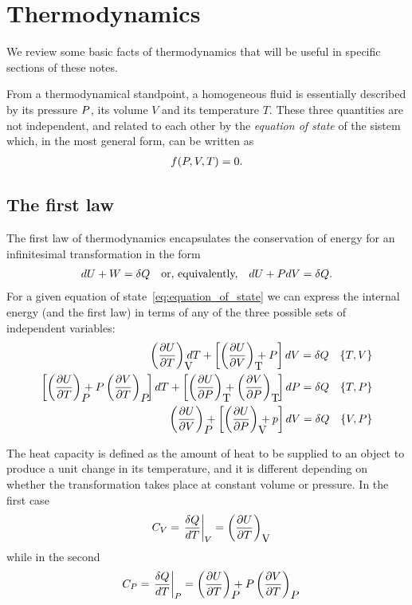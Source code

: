 \chapter{Thermodynamics}\label{chap:thermodynamics}


We review some basic facts of thermodynamics that will be useful in specific
sections of these notes.

From a thermodynamical standpoint, a homogeneous fluid is essentially described
by its pressure $P$, its volume $V$ and its temperature $T$. These
three quantities are not independent, and related to each other by the
\emph{equation of state} of the sistem which, in the most general form, can
be written as
\begin{align}\label{eq:equation_of_state}
  f(P, V, T) = 0.
\end{align}


\section{The first law}

The first law of thermodynamics encapsulates the conservation of energy for an
infinitesimal transformation in the form
\begin{align}\label{eq:thermo_first_law}
  dU + W = \delta Q
  \quad\text{or, equivalently,}\quad
  dU + P dV = \delta Q.
\end{align}
For a given equation of state~\eqref{eq:equation_of_state} we can express the internal
energy (and the first law) in terms of any of the three possible sets of independent
variables:
\begin{align*}
  \parderr{U}{T}{V} dT + \left[ \parderr{U}{V}{T} + \pressure\right] dV = \delta Q
  \quad \{T, V\}\\
  \left[ \parderr{U}{T}{\pressure} + \pressure\parderr{V}{T}{\pressure} \;\; \right] dT +
  \left[ \parderr{U}{\pressure}{T} + \parderr{V}{\pressure}{T} \;\; \right] d\pressure = \delta Q
  \quad \{T, \pressure\}\\
  \parderr{U}{V}{\pressure} + \left[ \parderr{U}{\pressure}{V} + p \right] dV = \delta Q
  \quad \{V, \pressure\}
\end{align*}

The heat capacity is defined as the amount of heat to be supplied to an object to
produce a unit change in its temperature, and it is different depending
on whether the transformation takes place at constant volume or pressure. In
the first case
\begin{align}
  C_V = \left. \frac{\delta Q}{dT} \right|_V = \parderr{U}{T}{V}
\end{align}
while in the second
\begin{align}
  C_\pressure = \left. \frac{\delta Q}{dT} \right|_\pressure =
    \parderr{U}{T}{\pressure} + \pressure\parderr{V}{T}{\pressure}
\end{align}

